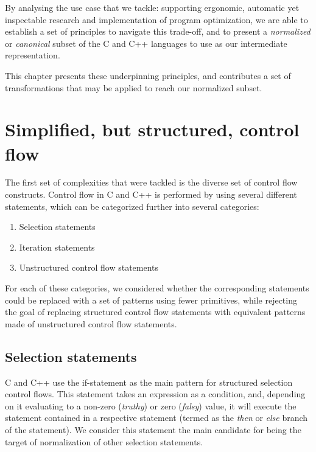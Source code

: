 By analysing the use case that we tackle: supporting ergonomic, automatic yet inspectable research and implementation of program optimization, we are able to establish a set of principles to navigate this trade-off, and to present a \textit{normalized} or \textit{canonical} subset of the C and C++ languages to use as our intermediate representation.

This chapter presents these underpinning principles, and contributes a set of transformations that may be applied to reach our normalized subset.

\section{Simplified, but structured, control flow}\label{sec:subset-control-flow}

The first set of complexities that were tackled is the diverse set of control flow constructs. Control flow in C and C++ is performed by using several different statements, which can be categorized further into several categories:

\begin{enumerate}
    \item Selection statements
    \item Iteration statements
    \item Unstructured control flow statements
\end{enumerate}

For each of these categories, we considered whether the corresponding statements could be replaced with a set of patterns using fewer primitives, while rejecting the goal of replacing structured control flow statements with equivalent patterns made of unstructured control flow statements.

\subsection{Selection statements}

C and C++ use the if-statement as the main pattern for structured selection control flows. This statement takes an expression as a condition, and, depending on it evaluating to a non-zero (\textit{truthy}) or zero (\textit{falsy}) value, it will execute the statement contained in a respective statement (termed as the \textit{then} or \textit{else} branch of the statement). We consider this statement the main candidate for being the target of normalization of other selection statements.


